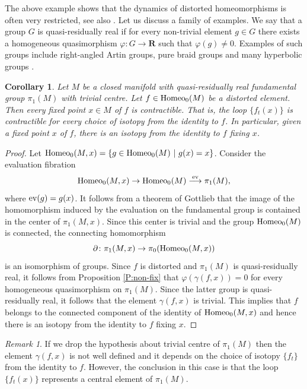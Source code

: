 \documentclass[11pt]{amsart}
\newtheorem{corollary}[subsection]{Corollary}
\theoremstyle{definition}
\theoremstyle{remark}
\newtheorem{remark}[subsection]{Remark}
\numberwithin{equation}{section}
\numberwithin{figure}{section}
\newcommand{\B}[1]{{\mathbf #1}}
\begin{document}
The above example shows that the dynamics of distorted homeomorphisms is often
very restricted, see also \cite{zbMATH06252351}. Let us discuss a family of examples.  We say that a group $G$
is quasi-residually real 
if for every non-trivial element $g\in G$ there exists a
homogeneous quasimorphism $\varphi\colon G\to \B R$ such that $\varphi(g)\neq
0$. Examples of such groups include right-angled Artin groups, pure braid
groups and many hyperbolic groups \cite{zbMATH06532523}.

\begin{corollary}\label{C:qrr}
Let $M$ be a closed manifold with quasi-residually real 
fundamental group $\pi_1(M)$ with trivial centre. Let $f\in {\rm Homeo}_0(M)$
be a distorted element.
Then every fixed point $x\in M$ of $f$ is contractible.
That is, the loop $\{f_t(x)\}$ is contractible for every choice
of isotopy from the identity to $f$.
In particular, given a fixed point $x$ of $f$, there is an isotopy from the identity to $f$
fixing $x$.
\end{corollary}
\begin{proof}
Let ${\rm Homeo}_0(M,x)=\{g\in {\rm Homeo}_0(M)\ |\ g(x)=x\}$.
Consider the evaluation fibration 
$$
{\rm Homeo}_0(M,x) \to {\rm Homeo}_0(M)\stackrel{{\rm ev}}\longrightarrow \pi_1(M),
$$
where ${\rm ev}(g) = g(x)$. 
It follows from a theorem of Gottlieb \cite[Theorem I.4]{zbMATH03239188} that the
image of the homomorphism induced by the evaluation on the fundamental group is
contained in the center of $\pi_1(M,x)$. Since this center is
trivial and the group ${\rm Homeo}_0(M)$ is connected, the connecting homomorphism
$$
\partial\colon \pi_1(M,x)\to \pi_0({\rm Homeo}_0(M,x))
$$ 
is an isomorphism
of groups. Since $f$ is distorted and $\pi_1(M)$ is quasi-residually real,
it follows from Proposition \ref{P:non-fix} that $\varphi(\gamma(f,x))=0$ for
every homogeneous quasimorphism on $\pi_1(M)$. Since the latter group is quasi-residually
real, it follows that
the element $\gamma(f,x)$ is trivial. This implies that $f$ belongs
to the connected component of the identity of ${\rm Homeo}_0(M,x)$ and hence
there is an isotopy from the identity to $f$ fixing $x$.
\end{proof}


\begin{remark}
If we drop the hypothesis about trivial centre of $\pi_1(M)$ then the element
$\gamma(f,x)$ is not well defined and it depends on the choice of isotopy
$\{f_t\}$ from the identity to $f$. However, the conclusion in this case
is that the loop $\{f_t(x)\}$ represents a central element
of $\pi_1(M)$.
\end{remark}
\end{document}
